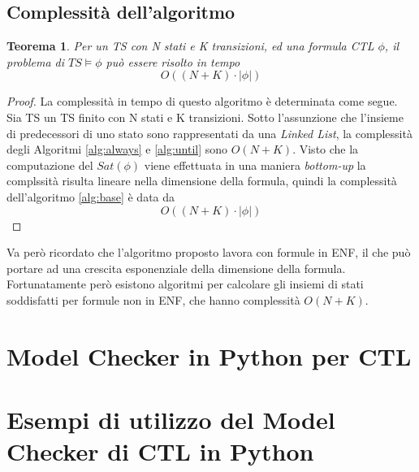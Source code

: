 \documentclass[a4paper, 10pt]{article}
\newtheorem{theor}{Teorema}[section]
\numberwithin{equation}{theor}
\begin{document}



\subsection{Complessità dell'algoritmo}
\begin{theor}
Per un \acf{TS} con N stati e K transizioni, ed una formula CTL $\phi$, il problema di $TS \models \phi$ può essere risolto in tempo $$O((N+K) \cdot |\phi|)$$
\end{theor}
\begin{proof}
La complessità in tempo di questo algoritmo è determinata come segue. Sia \ac{TS} un \acf{TS} finito con N stati e K transizioni. Sotto l'assunzione che l'insieme di predecessori di uno stato sono rappresentati da una \textit{Linked List}, la complessità degli Algoritmi \ref{alg:always} e \ref{alg:until} sono $O(N+K)$. Visto che la computazione del $Sat(\phi)$ viene effettuata in una maniera \textit{bottom-up} la complssità risulta lineare nella dimensione della formula, quindi la complessità dell'algoritmo \ref{alg:base} è data da $$O((N+K) \cdot |\phi|) $$
\end{proof}
Va però ricordato che l'algoritmo proposto lavora con formule in \ac{ENF}, il che può portare ad una crescita esponenziale della dimensione della formula. Fortunatamente però esistono algoritmi per calcolare gli insiemi di stati soddisfatti per formule non in ENF, che hanno complessità $O(N+K)$.
\section{Model Checker in Python per \ac{CTL}}

\section{Esempi di utilizzo del Model Checker di \ac{CTL} in Python}

\begin{acronym}
\end{acronym}
\end{document}
